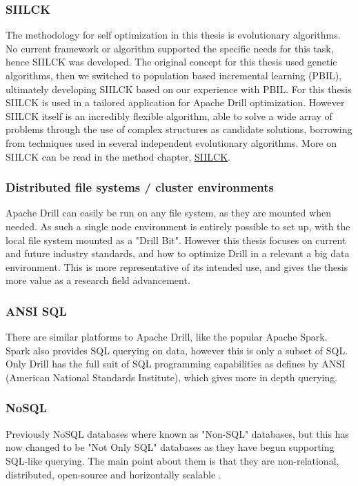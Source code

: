 \documentclass[a4paper,english]{report}
\begin{document}
			\subsubsection{SIILCK}
			The methodology for self optimization in this thesis is evolutionary algorithms. No current framework or algorithm supported the specific needs for this task, hence SIILCK was developed. The original concept for this thesis used genetic algorithms, then we switched to population based incremental learning (PBIL), ultimately developing SIILCK based on our experience with PBIL. For this thesis SIILCK is used in a tailored application for Apache Drill optimization. However SIILCK itself is an incredibly flexible algorithm, able to solve a wide array of problems through the use of complex structures as candidate solutions, borrowing from techniques used in several independent evolutionary algorithms. More on SIILCK can be read in the method chapter, \hyperref[sec:siilck]{SIILCK}.
			\subsubsection{Distributed file systems / cluster environments}
			Apache Drill can easily be run on any file system, as they are mounted when needed. As such a single node environment is entirely possible to set up, with the local file system mounted as a "Drill Bit". However this thesis focuses on current and future industry standards, and how to optimize Drill in a relevant a big data environment. This is more representative of its intended use, and gives the thesis more value as a research field advancement.
			\subsubsection{ANSI SQL}
			There are similar platforms to Apache Drill, like the popular Apache Spark. Spark also provides SQL querying on data, however this is only a subset of SQL. Only Drill has the full suit of SQL programming capabilities as defines by ANSI (American National Standards Institute), which gives more in depth querying.
			\subsubsection{NoSQL}
			Previously NoSQL databases where known as "Non-SQL" databases, but this has now changed to be "Not Only SQL" databases as they have begun supporting SQL-like querying. The main point about them is that they are non-relational, distributed, open-source and horizontally scalable \cite{no_sql}.
	
\end{document}
